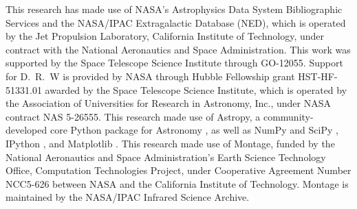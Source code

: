 \documentclass[iop, tighten]{emulateapj}
\begin{document}
This research has made use of NASA's Astrophysics Data System Bibliographic
Services and the NASA/IPAC Extragalactic Database (NED), which is operated by
the Jet Propulsion Laboratory, California Institute of Technology, under
contract with the National Aeronautics and Space Administration. This work was
supported by the Space Telescope Science Institute through GO-12055. Support
for D.~R.~W is provided by NASA through Hubble Fellowship grant HST-HF-51331.01
awarded by the Space Telescope Science Institute, which is operated by the
Association of Universities for Research in Astronomy, Inc., under NASA
contract NAS 5-26555. This research made use of Astropy, a community-developed
core Python package for Astronomy \citep{Astropy_Collaboration:2013}, as well
as NumPy and SciPy \citep{Oliphant:2007}, IPython \citep{Perez:2007}, and
Matplotlib \citep{Hunter:2007}. This research made use of Montage, funded by
the National Aeronautics and Space Administration's Earth Science Technology
Office, Computation Technologies Project, under Cooperative Agreement Number
NCC5-626 between NASA and the California Institute of Technology. Montage is
maintained by the NASA/IPAC Infrared Science Archive.






\end{document}
